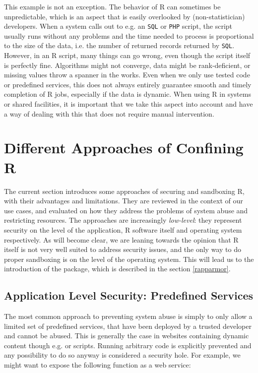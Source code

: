 \documentclass[article]{jss}
\newcommand{\R}{\textsf{R}\xspace}
\newcommand{\RAppArmor}{\pkg{RAppArmor}\xspace}
\begin{document}
This example is not an exception. The behavior of \R can sometimes be
unpredictable, which is an aspect that is easily overlooked by
(non-statistician) developers. When a system calls out to e.g. an \texttt{SQL}
or \texttt{PHP} script, the script usually runs without any problems and the
time needed to process is proportional to the size of the data, i.e. the number
of returned records returned by \texttt{SQL}. However, in an \R
script, many things can go wrong, even though the script itself is perfectly
fine. Algorithms might not converge, data might be rank-deficient, or missing
values throw a spanner in the works. Even when we only use tested code or
predefined services, this does not always entirely guarantee smooth and timely
completion of \R jobs, especially if the data is dynamic. When using
\R in systems or shared facilities, it is important that we take this
aspect into account and have a way of dealing with this that does not require
manual intervention.

\section{Different Approaches of Confining R}

The current section introduces some approaches of securing and sandboxing
\R, with their advantages and limitations. They are reviewed in the
context of our use cases, and evaluated on how they address the problems of
system abuse and restricting resources. The approaches are increasingly
\emph{low-level}: they represent security on the level of the application, R
software itself and operating system respectively. As will become clear, we are
leaning towards the opinion that \R itself is not very well suited to address security issues, and the only way to do proper sandboxing is on the level of the
operating system. This will lead us to the introduction of the \RAppArmor
package, which is described in the section \ref{rapparmor}.


\subsection{Application Level Security: Predefined Services}

The most common approach to preventing system abuse is simply to only allow a
limited set of predefined services, that have been deployed by a trusted
developer and cannot be abused. This is generally the case in websites
containing dynamic content though e.g.  or  scripts.
Running arbitrary code is explicitly prevented and any possibility to do so
anyway is considered a security hole. For example, we might want to expose the
following function as a web service:
\end{document}
